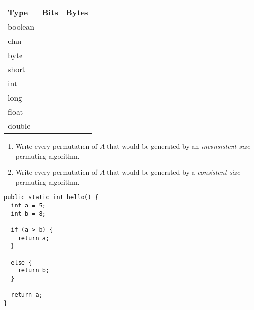 \documentclass[11pt,addpoints]{exam}
\begin{document}
\begin{questions}


\begin{table}[H]
\centering
\begin{tabular}{|l|l|l|}
  \hline
  Type & Bits & Bytes \\ \hline
  boolean && \\ \hline
  char && \\ \hline
  byte && \\ \hline
  short && \\ \hline
  int && \\ \hline
  long && \\ \hline
  float && \\ \hline
  double && \\ \hline
\end{tabular}
\end{table}



\begin{enumerate}[label=(\Alph*)]
  \item Write every permutation of $A$ that would be generated by an \textit{inconsistent size} permuting algorithm.


  \item Write every permutation of $A$ that would be generated by a \textit{consistent size} permuting algorithm.
    
\end{enumerate}

\begin{minipage}{\textwidth}


\begin{verbatim}
public static int hello() {
  int a = 5;
  int b = 8;

  if (a > b) {
    return a;
  }

  else {
    return b;
  }

  return a;
}
\end{verbatim}
\end{minipage}


\end{questions}
\end{document}
